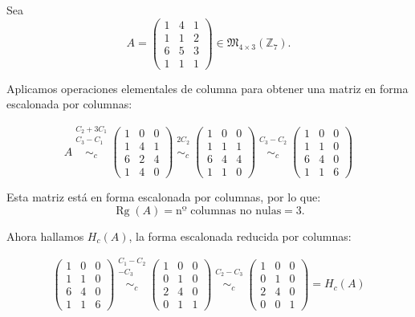 \documentclass[a4paper,12pt]{article}
\begin{document}
\begin{ejemplo}[title=Ejemplo de cálculo del rango por filas]
Sea
\[
A =
\begin{pmatrix}
1 & 4 & 1 \\
1 & 1 & 2 \\
6 & 5 & 3 \\
1 & 1 & 1
\end{pmatrix}
\in \mathfrak{M}_{4 \times 3}(\mathbb{Z}_7).
\]

Aplicamos operaciones elementales de columna para obtener una matriz en forma escalonada por columnas:

\[
A
\overset{\substack{
C_2 + 3C_1 \\
C_3 - C_1 \\ {}
}}{\sim_c}
\begin{pmatrix}
1 & 0 & 0 \\
1 & 4 & 1 \\
6 & 2 & 4 \\
1 & 4 & 0
\end{pmatrix}
\overset{\substack{
2C_2 \\ {}
}}{\sim_c}
\begin{pmatrix}
1 & 0 & 0 \\
1 & 1 & 1 \\
6 & 4 & 4 \\
1 & 1 & 0
\end{pmatrix}
\overset{\substack{
C_3 - C_2 \\ {}
}}{\sim_c}
\begin{pmatrix}
1 & 0 & 0 \\
1 & 1 & 0 \\
6 & 4 & 0 \\
1 & 1 & 6
\end{pmatrix}
\]

Esta matriz está en forma escalonada por columnas, por lo que:
\[
\operatorname{Rg}(A) = \text{nº columnas no nulas} = 3.
\]

Ahora hallamos $H_c(A)$, la forma escalonada reducida por columnas:

\[
\begin{pmatrix}
1 & 0 & 0 \\
1 & 1 & 0 \\
6 & 4 & 0 \\
1 & 1 & 6
\end{pmatrix}
\overset{\substack{
C_1 - C_2 \\
- C_3 \\ {}
}}{\sim_c}
\begin{pmatrix}
1 & 0 & 0 \\
0 & 1 & 0 \\
2 & 4 & 0 \\
0 & 1 & 1
\end{pmatrix}
\overset{\substack{
C_2 - C_3 \\ {}
}}{\sim_c}
\begin{pmatrix}
1 & 0 & 0 \\
0 & 1 & 0 \\
2 & 4 & 0 \\
0 & 0 & 1
\end{pmatrix}
= H_c(A)
\]


\end{ejemplo}
\end{document}
